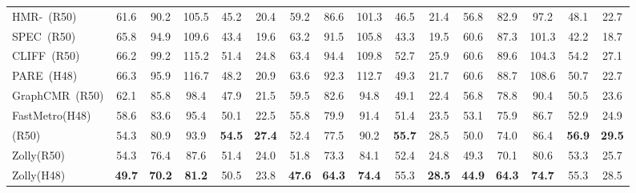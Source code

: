 \documentclass[10pt,twocolumn,letterpaper]{article}
\def\Ours{{Zolly}\xspace}
\begin{document}
{\begin{table*}[hb]
{\begin{tabular}{lccccc|ccccc|ccccc}
\rule{0pt}{10pt} HMR-~(R50)~\cite{hmr}& 61.6 & 90.2 & 105.5 & 45.2 & 20.4 & 59.2 & 86.6 & 101.3 & 46.5 & 21.4 &56.8 & 82.9 & 97.2 & 48.1 & 22.7  \\

\rule{0pt}{10pt} SPEC~(R50)~\cite{spec}  &  65.8 & 94.9 & 109.6 & 43.4 & 19.6 & 63.2 & 91.5 & 105.8 &43.3 & 19.5 &60.6 & 87.3 & 101.3 & 42.2 & 18.7   \\

\rule{0pt}{10pt} CLIFF~(R50)~\cite{cliff} & 66.2 & 99.2 & 115.2 & 51.4 & 24.8 & 63.4 & 94.4 & 109.8 & 52.7 & 25.9 & 60.6 & 89.6 & 104.3 & 54.2 & 27.1 \\



\rule{0pt}{10pt} PARE~(H48)~\cite{pare} & 66.3 & 95.9 & 116.7 & 48.2 & 20.9 &63.6& 92.3 & 112.7 & 49.3 & 21.7 & 60.6 & 88.7 & 108.6 & 50.7 & 22.7   \\

\midrule
\rule{0pt}{10pt} GraphCMR~(R50)   &  62.1 & 85.8 & 98.4 & 47.9 & 21.5 & 59.5 & 82.6 & 94.8 & 49.1 & 22.4 & 56.8 & 78.8 & 90.4 & 50.5 & 23.6\\

\rule{0pt}{10pt} FastMetro(H48)~\cite{fastmetro}   &58.6 & 83.6 & 95.4 & 50.1 & 22.5 & 55.8 & 79.9 & 91.4 & 51.4 & 23.5  & 53.1 & 75.9 & 86.7 & 52.9 & 24.9 \\

\midrule
\rule{0pt}{10pt}  (R50)  &  54.3 & 80.9 & 93.9 & \textbf{54.5} & \textbf{27.4} & 52.4 & 77.5 & 90.2 & \textbf{55.7} & 28.5 & 50.0 & 74.0 & 86.4 & \textbf{56.9} & \textbf{29.5} \\
\rule{0pt}{10pt} \Ours (R50)  &  54.3 & 76.4&87.6 & 51.4 & 24.0 & 51.8 & 73.3 & 84.1 & 52.4 & 24.8 &  49.3 & 70.1 & 80.6 & 53.3 & 25.7 \\
\rule{0pt}{10pt} \Ours (H48)  & \textbf{49.7} & \textbf{70.2} & \textbf{81.2} & 50.5 & 23.8 & \textbf{47.6} & \textbf{64.3} & \textbf{74.4} & 55.3 & \textbf{28.5} & \textbf{44.9} & \textbf{64.3} & \textbf{74.7} & 55.3 & 28.5     \\
\bottomrule

\end{tabular}
 }
    
    \caption{Results of SOTA methods on PDHuman (, ,  protocols). HMR- terms HMR~\cite{hmr} model trained with same focal length as \Ours.}
    \label{tab:sota_supp_pdhuman}
\end{table*}

\begin{table*}[h]
    \centering
\end{table*}}
\end{document}
